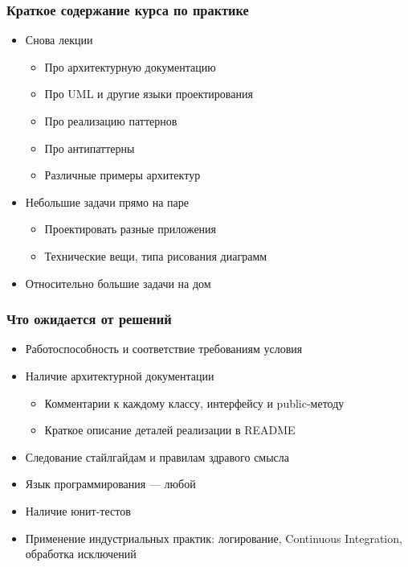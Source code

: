 \documentclass[xetex,mathserif,serif]{beamer}
\begin{document}
    \begin{frame}
        \frametitle{Краткое содержание курса по практике}
        \begin{itemize}
            \item Снова лекции
            \begin{itemize}
                \item Про архитектурную документацию
                \item Про UML и другие языки проектирования
                \item Про реализацию паттернов
                \item Про антипаттерны
                \item Различные примеры архитектур
            \end{itemize}
            \item Небольшие задачи прямо на паре
            \begin{itemize}
                \item Проектировать разные приложения
                \item Технические вещи, типа рисования диаграмм
            \end{itemize}
            \item Относительно большие задачи на дом
        \end{itemize}
    \end{frame}
    
    \begin{frame}
        \frametitle{Что ожидается от решений}
        \begin{itemize}
            \item Работоспособность и соответствие требованиям условия
            \item Наличие архитектурной документации
            \begin{itemize}
                \item Комментарии к каждому классу, интерфейсу и public-методу
                \item Краткое описание деталей реализации в README
            \end{itemize}
            \item Следование стайлгайдам и правилам здравого смысла 
            \item Язык программирования --- любой
            \item Наличие юнит-тестов
            \item Применение индустриальных практик: логирование, Continuous Integration, обработка исключений
        \end{itemize}
    \end{frame}
\end{document}
